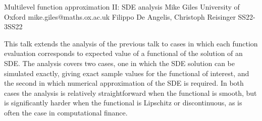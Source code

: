 \begin{talk}
  {Multilevel function approximation II: SDE analysis}%
  {Mike Giles}%
  {University of Oxford}%
  {mike.giles@maths.ox.ac.uk}%
  {Filippo De Angelis, Christoph Reisinger}%
{}{}{SS22-3}{SS22}


  This talk extends the analysis of the previous talk to cases in which each function evaluation corresponds to expected value of a functional of the solution of an SDE.  The analysis covers two cases, one in which the SDE solution can be simulated exactly, giving exact sample values for the functional of interest, and the second in which numerical approximation of the SDE is required.  In both cases the analysis is relatively straightforward when the functional is smooth, but is significantly harder when the functional is Lipschitz or discontinuous, as is often the case in computational finance.

\end{talk}

